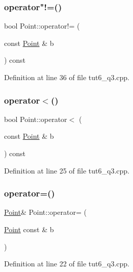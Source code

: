\subsubsection{\texorpdfstring{operator"!=()}{operator!=()}}
{\footnotesize\ttfamily bool Point\+::operator!= (\begin{DoxyParamCaption}\item[{const \hyperlink{struct_point}{Point} \&}]{b }\end{DoxyParamCaption}) const\hspace{0.3cm}{\ttfamily [inline]}}



Definition at line 36 of file tut6\+\_\+q3.\+cpp.

\mbox{\label{struct_point_ad7e2bd4ef0f76e601a88b319a9197de1}} 
\subsubsection{\texorpdfstring{operator$<$()}{operator<()}}
{\footnotesize\ttfamily bool Point\+::operator$<$ (\begin{DoxyParamCaption}\item[{const \hyperlink{struct_point}{Point} \&}]{b }\end{DoxyParamCaption}) const\hspace{0.3cm}{\ttfamily [inline]}}



Definition at line 25 of file tut6\+\_\+q3.\+cpp.

\mbox{\label{struct_point_a747f1de8a657c95d9afc2976ef47829b}} 
\subsubsection{\texorpdfstring{operator=()}{operator=()}}
{\footnotesize\ttfamily \hyperlink{struct_point}{Point}\& Point\+::operator= (\begin{DoxyParamCaption}\item[{\hyperlink{struct_point}{Point} const \&}]{b }\end{DoxyParamCaption})\hspace{0.3cm}{\ttfamily [inline]}}



Definition at line 22 of file tut6\+\_\+q3.\+cpp.

